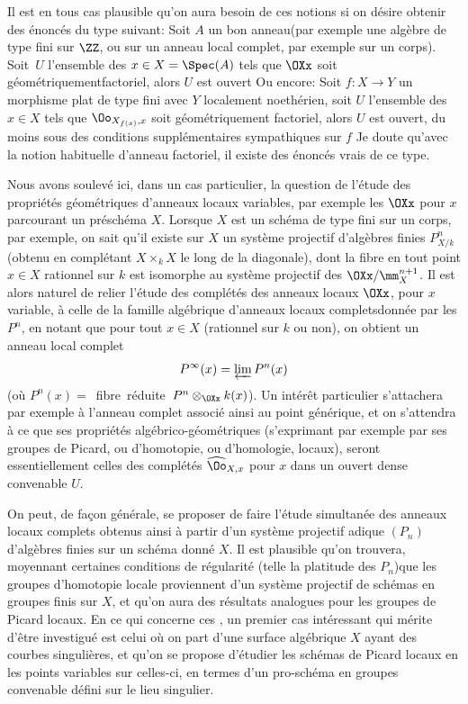 Il est en tous cas plausible qu'on aura besoin de ces notions si on d\'esire obtenir des \'enonc\'es du type suivant: Soit $A$ un \og bon anneau\fg (par exemple une alg\`ebre de type fini sur $\ZZ$, ou sur un anneau local complet, par exemple sur un corps). Soit~$U$ l'ensemble des $x\in X=\Spec(A)$ tels que $\OXx$ soit \og g\'eom\'etriquement\pageoriginale factoriel\fg, alors $U$ est ouvert Ou encore: Soit $f\colon X\to Y$ un morphisme plat de type fini avec $Y$ localement noeth\'erien, soit $U$ l'ensemble des $x\in X$ tels que $\Oo_{X_{f(x)}, x}$ soit \og g\'eom\'etriquement factoriel\fg, alors $U$ est ouvert, du moins sous des conditions suppl\'ementaires sympathiques sur $f$ Je doute qu'avec la notion habituelle d'anneau factoriel, il existe des \'enonc\'es vrais de ce type.

Nous avons soulev\'e ici, dans un cas particulier, la question de l'\'etude des propri\'et\'es g\'eom\'etriques d'anneaux locaux \og variables\fg, par exemple les $\OXx$ pour $x$ parcourant un pr\'esch\'ema $X$. Lorsque $X$ est un sch\'ema de type fini sur un corps, par exemple, on sait qu'il existe sur $X$ un syst\`eme projectif d'alg\`ebres finies $P^n_{X/k}$ (obtenu en compl\'etant $X\times_k X$ le long de la diagonale), dont la fibre en tout point $x\in X$ rationnel sur $k$ est isomorphe au syst\`eme projectif des $\OXx/\mm_X^{n+1}$. Il est alors naturel de relier l'\'etude des compl\'et\'es des anneaux locaux $\OXx$, pour $x$ variable, \`a celle de la \og famille alg\'ebrique d'anneaux locaux complets\fg donn\'ee par les $P^n$, en notant que pour tout $x\in X$ (rationnel sur $k$ ou non), on obtient un anneau local complet
$$
P^{\infty}(x)=\varprojlim P^n(x)
$$
(o\`u $P^n(x)=$~fibre~r\'eduite~$P^n\otimes_{\OXx}k(x)$). Un int\'er\^et particulier s'attachera par exemple \`a l'anneau complet associ\'e ainsi au point g\'en\'erique, et on s'attendra \`a ce que ses propri\'et\'es alg\'ebrico-g\'eom\'etriques (s'exprimant par exemple par ses groupes de Picard, ou d'homotopie, ou d'homologie, locaux), seront essentiellement celles des compl\'et\'es $\widehat{\Oo}_{X, x}$ pour $x$ dans un ouvert dense convenable $U$.

On peut, de fa\c con g\'en\'erale, se proposer de faire l'\'etude simultan\'ee des anneaux locaux complets obtenus ainsi \`a partir d'un syst\`eme projectif adique $(P_n)$ d'alg\`ebres finies sur un sch\'ema donn\'e $X$. Il est plausible qu'on trouvera, moyennant certaines conditions de r\'egularit\'e (telle la platitude des $P_n$)\pageoriginale que les groupes d'homotopie locale proviennent d'un syst\`eme projectif de sch\'emas en groupes finis sur $X$, et qu'on aura des r\'esultats analogues pour les groupes de Picard locaux. En ce qui concerne ces , un premier cas int\'eressant qui m\'erite d'\^etre investigu\'e est celui o\`u on part d'une surface alg\'ebrique $X$ ayant des courbes singuli\`eres, et qu'on se propose d'\'etudier les sch\'emas de Picard locaux en les points variables sur celles-ci, en termes d'un pro-sch\'ema en groupes convenable d\'efini sur le lieu singulier.

